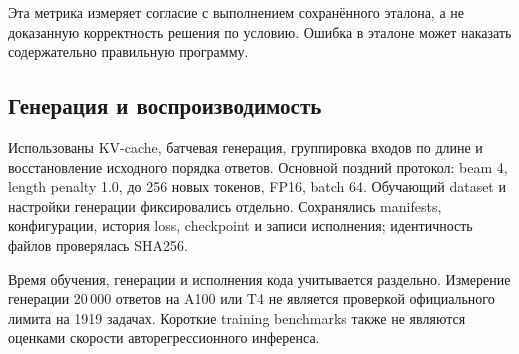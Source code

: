 Эта метрика измеряет согласие с выполнением сохранённого эталона,
а не доказанную корректность решения по условию. Ошибка в эталоне
может наказать содержательно правильную программу.

\subsection{Генерация и воспроизводимость}
Использованы KV-cache, батчевая генерация, группировка входов по длине
и восстановление исходного порядка ответов. Основной поздний протокол:
beam 4, length penalty 1.0, до 256 новых токенов, FP16, batch 64.
Обучающий dataset и настройки генерации фиксировались отдельно.
Сохранялись manifests, конфигурации, история loss, checkpoint и
записи исполнения; идентичность файлов проверялась SHA256.

Время обучения, генерации и исполнения кода учитывается раздельно.
Измерение генерации 20\,000 ответов на A100 или T4 не является
проверкой официального лимита на 1919 задачах. Короткие training benchmarks
также не являются оценками скорости авторегрессионного инференса.

